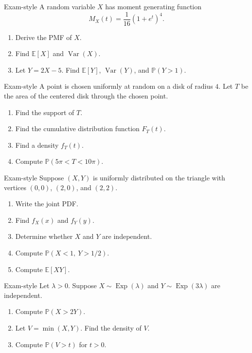 \documentclass[12pt]{article}
\newcommand{\EE}{\mathbb{E}}
\newcommand{\PP}{\mathbb{P}}
\newcommand{\Var}{\operatorname{Var}}
\newcommand{\Exp}{\operatorname{Exp}}
\newcommand{\writespace}[1]{\vspace*{#1}}
\newcommand{\xlongws}{\writespace{4.1cm}}
\newcounter{problem}[section]
\begin{document}
\begin{practiceproblem}{Exam-style}
A random variable $X$ has moment generating function
\[
  M_X(t)=\frac{1}{16}(1+e^t)^4.
\]
\begin{enumerate}
  \item Derive the PMF of $X$.
  \item Find $\EE[X]$ and $\Var(X)$.
  \item Let $Y=2X-5$. Find $\EE[Y]$, $\Var(Y)$, and $\PP(Y>1)$.
\end{enumerate}
\end{practiceproblem}
\xlongws

\begin{practiceproblem}{Exam-style}
A point is chosen uniformly at random on a disk of radius $4$. Let $T$ be the area of the centered disk through the chosen point.
\begin{enumerate}
  \item Find the support of $T$.
  \item Find the cumulative distribution function $F_T(t)$.
  \item Find a density $f_T(t)$.
  \item Compute $\PP(5\pi < T < 10\pi)$.
\end{enumerate}
\end{practiceproblem}
\xlongws

\begin{practiceproblem}{Exam-style}
Suppose $(X,Y)$ is uniformly distributed on the triangle with vertices $(0,0)$, $(2,0)$, and $(2,2)$.
\begin{enumerate}
  \item Write the joint PDF.
  \item Find $f_X(x)$ and $f_Y(y)$.
  \item Determine whether $X$ and $Y$ are independent.
  \item Compute $\PP(X<1,\ Y>1/2)$.
  \item Compute $\EE[XY]$.
\end{enumerate}
\end{practiceproblem}
\xlongws

\begin{practiceproblem}{Exam-style}
Let $\lambda>0$. Suppose $X\sim\Exp(\lambda)$ and $Y\sim\Exp(3\lambda)$ are independent.
\begin{enumerate}
  \item Compute $\PP(X>2Y)$.
  \item Let $V=\min(X,Y)$. Find the density of $V$.
  \item Compute $\PP(V>t)$ for $t>0$.
\end{enumerate}
\end{practiceproblem}
\xlongws
\end{document}
